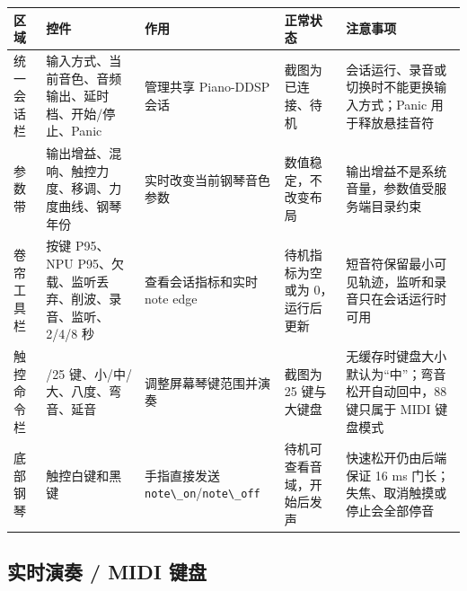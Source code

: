 \begin{longtable}[]{@{}
  >{\raggedright\arraybackslash}p{}
  >{\raggedright\arraybackslash}p{}
  >{\raggedright\arraybackslash}p{}
  >{\raggedright\arraybackslash}p{}
  >{\raggedright\arraybackslash}p{}@{}}
\toprule\noalign{}
\begin{minipage}[b]{\linewidth}\raggedright
区域
\end{minipage} & \begin{minipage}[b]{\linewidth}\raggedright
控件
\end{minipage} & \begin{minipage}[b]{\linewidth}\raggedright
作用
\end{minipage} & \begin{minipage}[b]{\linewidth}\raggedright
正常状态
\end{minipage} & \begin{minipage}[b]{\linewidth}\raggedright
注意事项
\end{minipage} \\
\midrule\noalign{}
\endhead
\bottomrule\noalign{}
\endlastfoot
统一会话栏 & 输入方式、当前音色、音频输出、延时档、开始/停止、Panic &
管理共享 Piano-DDSP 会话 & 截图为已连接、待机 &
会话运行、录音或切换时不能更换输入方式；Panic 用于释放悬挂音符 \\
参数带 & 输出增益、混响、触控力度、移调、力度曲线、钢琴年份 &
实时改变当前钢琴音色参数 & 数值稳定，不改变布局 &
输出增益不是系统音量，参数值受服务端目录约束 \\
卷帘工具栏 & 按键 P95、NPU P95、欠载、监听丢弃、削波、录音、监听、2/4/8
秒 & 查看会话指标和实时 note edge & 待机指标为空或为 0，运行后更新 &
短音符保留最小可见轨迹，监听和录音只在会话运行时可用 \\
触控命令栏 & 13/25 键、小/中/大、八度、弯音、延音 &
调整屏幕琴键范围并演奏 & 截图为 25 键与大键盘 &
无缓存时键盘大小默认为``中''；弯音松开自动回中，88 键只属于 MIDI
键盘模式 \\
底部钢琴 & 触控白键和黑键 & 手指直接发送
\passthrough{\lstinline!note\_on!}/\passthrough{\lstinline!note\_off!} &
待机可查看音域，开始后发声 & 快速松开仍由后端保证 16 ms
门长；失焦、取消触摸或停止会全部停音 \\
\end{longtable}

\subsection{实时演奏 / MIDI
键盘}\label{src-experiment-case3-ui-midi-keyboard}

